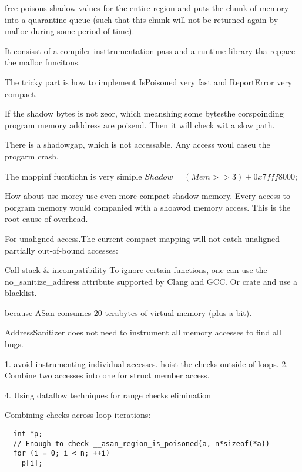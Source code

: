 free poisons shadow values for the entire region and puts the chunk of memory into a quarantine queue (such that this chunk will not be returned again by malloc during some period of time).


It consisst of a compiler insttrumentation pass and
a runtime library tha rep;ace the malloc funcitons.

The tricky part is how to implement IsPoisoned very fast and ReportError very compact.

If the shadow bytes is not zeor, which meanshing some bytesthe corspoinding program memory adddress
are poisend. Then it will check wit a slow path.

There is a shadowgap, which is not accessable.
Any access woul caseu the progarm crash.

The mappinf fucntiohn is very simiple
$Shadow = (Mem >> 3) + 0x7fff8000;$

How about use morey use even more compact shadow memory.
Every access to porgram memory would companied with a shoawod memory access.
This is the root cause of overhead.

For unaligned access.The current compact mapping will not catch unaligned partially out-of-bound accesses:



Call stack & incompatibility
To ignore certain functions, one can use the no_sanitize_address attribute
supported by Clang and GCC.
Or crate and use a blacklist.

because ASan consumes 20 terabytes of virtual memory (plus a bit).


AddressSanitizer does not need to instrument all memory accesses to find all bugs.

1. avoid instrumenting individual accesses. hoist the checks outside of loops.
2. Combine two accesses into one for struct member access.

4. Using dataflow techniques for range checks elimination

Combining checks across loop iterations:

\begin{verbatim}
  int *p;
  // Enough to check __asan_region_is_poisoned(a, n*sizeof(*a))
  for (i = 0; i < n; ++i)
    p[i];
\end{verbatim}

